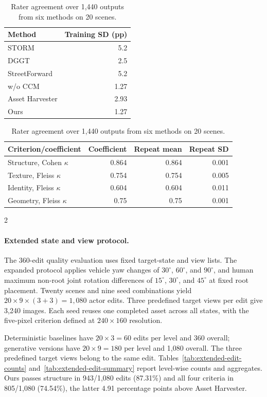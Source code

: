 \begin{table}[H]
\begin{minipage}[t]{0.48\textwidth}
\centering\small
\setlength{\tabcolsep}{4pt}
\caption{Training SD of basic-protocol joint acceptance, in percentage points.}
\label{tab:edit-training-sd}
\begin{tabular}{@{}lr@{}}
\toprule
Method & Training SD (pp) \\
\midrule
STORM & 5.2 \\
DGGT & 2.5 \\
StreetForward & 5.2 \\
w/o CCM & 1.27 \\
Asset Harvester & 2.93 \\
Ours & 1.27 \\
\bottomrule
\end{tabular}
\end{minipage}\hfill
\begin{minipage}[t]{0.48\textwidth}
\centering\small
\setlength{\tabcolsep}{4pt}
\caption{Rater agreement over 1,440 outputs from six methods on 20 scenes.}
\label{tab:rater-agreement}
\begin{tabular}{@{}lrrr@{}}
\toprule
Criterion/coefficient & Coefficient & Repeat mean & Repeat SD \\
\midrule
Structure, Cohen $\kappa$ & 0.864 & 0.864 & 0.001 \\
Texture, Fleiss $\kappa$ & 0.754 & 0.754 & 0.005 \\
Identity, Fleiss $\kappa$ & 0.604 & 0.604 & 0.011 \\
Geometry, Fleiss $\kappa$ & 0.75 & 0.75 & 0.001 \\
\bottomrule
\end{tabular}
\end{minipage}
\end{table}
\begin{multicols}{2}

\paragraph{Extended state and view protocol.}
The 360-edit quality evaluation uses fixed target-state and view lists. The expanded protocol applies vehicle yaw changes of $30^\circ$, $60^\circ$, and $90^\circ$, and human maximum non-root joint rotation differences of $15^\circ$, $30^\circ$, and $45^\circ$ at fixed root placement. Twenty scenes and nine seed combinations yield $20\times9\times(3+3)=1,080$ actor edits. Three predefined target views per edit give 3,240 images. Each seed reuses one completed asset across all states, with the five-pixel criterion defined at $240\times160$ resolution.

Deterministic baselines have $20\times3=60$ edits per level and 360 overall; generative versions have $20\times9=180$ per level and 1,080 overall. The three predefined target views belong to the same edit. Tables~\ref{tab:extended-edit-counts} and~\ref{tab:extended-edit-summary} report level-wise counts and aggregates. Ours passes structure in 943/1,080 edits (87.31\%) and all four criteria in 805/1,080 (74.54\%), the latter 4.91 percentage points above Asset Harvester.

\end{multicols}
